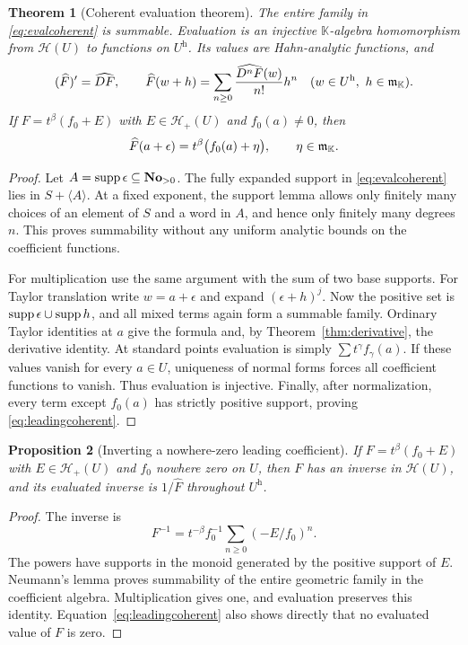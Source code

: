 \documentclass[11pt,a4paper]{article}
\newtheorem{theorem}{Theorem}[section]
\newtheorem{proposition}[theorem]{Proposition}
\theoremstyle{definition}\newtheorem{definition}[theorem]{Definition}
\theoremstyle{remark}\newtheorem{remark}[theorem]{Remark}
\newcommand{\No}{\mathbf{No}}
\newcommand{\K}{\mathbb K}
\newcommand{\A}{\mathscr H}\newcommand{\hol}{\mathcal O}
\newcommand{\ev}[1]{\widehat{#1}}
\newcommand{\halo}[1]{#1^{\mathrm h}}
\numberwithin{equation}{section}
\begin{document}
\begin{theorem}[Coherent evaluation theorem]\label{thm:coherenteval}
The entire family in \eqref{eq:evalcoherent} is summable. Evaluation is an injective $\K$-algebra homomorphism from $\A(U)$ to functions on $\halo U$. Its values are Hahn-analytic functions, and
\[
 (\ev F)'=\ev{DF},\qquad
 \ev F(w+h)=\sum_{n\geq0}\frac{\ev{D^nF}(w)}{n!}h^n
 \quad(w\in\halo U,\ h\in\infinit).
\]
If $F=t^\beta(f_0+E)$ with $E\in\A_+(U)$ and $f_0(a)\ne0$, then
\begin{equation}\label{eq:leadingcoherent}
 \ev F(a+\epsilon)=t^\beta\bigl(f_0(a)+\eta\bigr),
 \qquad \eta\in\infinit.
\end{equation}
\end{theorem}
\begin{proof}
Let $A=\supp\epsilon\subseteq\No_{>0}$. The fully expanded support in \eqref{eq:evalcoherent} lies in $S+\langle A\rangle$. At a fixed exponent, the support lemma allows only finitely many choices of an element of $S$ and a word in $A$, and hence only finitely many degrees $n$. This proves summability without any uniform analytic bounds on the coefficient functions.

For multiplication use the same argument with the sum of two base supports. For Taylor translation write $w=a+\epsilon$ and expand $(\epsilon+h)^j$. Now the positive set is $\operatorname{supp}\epsilon\cup\operatorname{supp} h$, and all mixed terms again form a summable family. Ordinary Taylor identities at $a$ give the formula and, by Theorem~\ref{thm:derivative}, the derivative identity. At standard points evaluation is simply $\sum t^\gamma f_\gamma(a)$. If these values vanish for every $a\in U$, uniqueness of normal forms forces all coefficient functions to vanish. Thus evaluation is injective. Finally, after normalization, every term except $f_0(a)$ has strictly positive support, proving \eqref{eq:leadingcoherent}.
\end{proof}

\begin{proposition}[Inverting a nowhere-zero leading coefficient]\label{prop:unit}
If $F=t^\beta(f_0+E)$ with $E\in\A_+(U)$ and $f_0$ nowhere zero on $U$, then $F$ has an inverse in $\A(U)$, and its evaluated inverse is $1/\ev F$ throughout $\halo U$.
\end{proposition}
\begin{proof}
The inverse is
\[
 F^{-1}=t^{-\beta}f_0^{-1}\sum_{n\geq0}(-E/f_0)^n.
\]
The powers have supports in the monoid generated by the positive support of $E$. Neumann's lemma proves summability of the entire geometric family in the coefficient algebra. Multiplication gives one, and evaluation preserves this identity. Equation~\eqref{eq:leadingcoherent} also shows directly that no evaluated value of $F$ is zero.
\end{proof}
\end{document}
